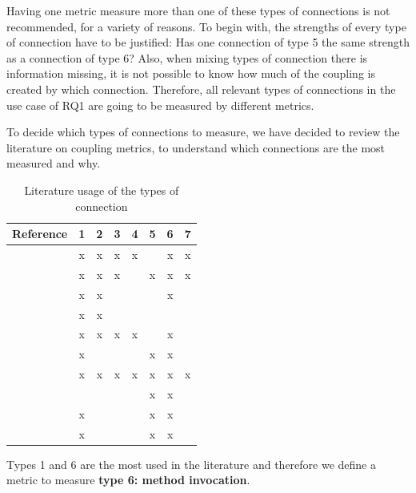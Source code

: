 Having one metric measure more than one of these types of connections is not recommended, for a variety of reasons. To begin with, the strengths of every type of connection have to be justified: Has one connection of type 5 the same strength as a connection of type 6? Also, when mixing types of connection there is information missing, it is not possible to know how much of the coupling is created by which connection. Therefore, all relevant types of connections in the use case of RQ1 are going to be measured by different metrics.

To decide which types of connections to measure, %
we have decided to review the literature on coupling metrics, to understand which connections are the most measured and why.

\begin{table}[ht!]
    \centering
    \begin{tabular}{|l|c|c|c|c|c|c|c|}
         \hline
         Reference                      & 1 & 2 & 3 & 4 & 5 & 6 & 7 \\\hline
         \cite{eder1994coupling}        & x & x & x & x &   & x & x \\\hline
         \cite{hitz1995measuring}       & x & x & x &   & x & x & x \\\hline
         \cite{briand1997investigation} & x & x &   &   &   & x &   \\\hline
         \cite{wilkie2000coupling}      & x & x &   &   &   &   &   \\\hline
         \cite{yang2005detecting}       & x & x & x & x &   & x &   \\\hline
         \cite{gui2007ranking}          & x &   &   &   & x & x &   \\\hline
         \cite{gupta2009package}        & x & x & x & x & x & x & x \\\hline
         \cite{harrison1998coupling}    &   &   &   &   & x & x &   \\\hline
         \cite{du2004refactoring}       & x &   &   &   & x & x &   \\\hline
         \cite{koetter2019assessing}    & x &   &   &   & x & x &   \\\hline
    \end{tabular}
    \caption{Literature usage of the types of connection}
    \label{tab:type-con-literature}
\end{table}

 Types 1 and 6 are the most used in the literature and therefore we define a metric to measure \textbf{type 6: method invocation}.

